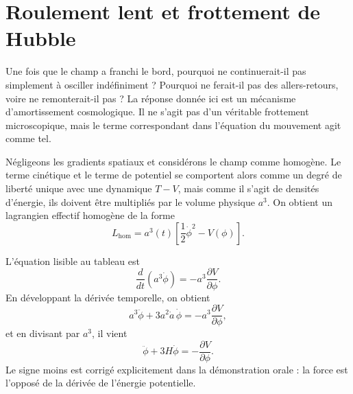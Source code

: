 \begin{classroomqa}
\end{classroomqa}

\section{Roulement lent et frottement de Hubble}

Une fois que le champ a franchi le bord, pourquoi ne continuerait-il pas simplement à osciller indéfiniment ? Pourquoi ne ferait-il pas des allers-retours, voire ne remonterait-il pas ? La réponse donnée ici est un mécanisme d’amortissement cosmologique. Il ne s’agit pas d’un véritable frottement microscopique, mais le terme correspondant dans l’équation du mouvement agit comme tel.

Négligeons les gradients spatiaux et considérons le champ comme homogène. Le terme cinétique et le terme de potentiel se comportent alors comme un degré de liberté unique avec une dynamique \(T-V\), mais comme il s’agit de densités d’énergie, ils doivent être multipliés par le volume physique \(a^3\). On obtient un lagrangien effectif homogène de la forme
\begin{equation}
L_{\mathrm{hom}}=a^3(t)\left[\frac12\dot\phi^2-V(\phi)\right].
\end{equation}

L’équation lisible au tableau est
\begin{equation}
\frac{d}{dt}\left(a^3\dot\phi\right)=-a^3\frac{\partial V}{\partial\phi}.
\end{equation}
En développant la dérivée temporelle, on obtient
\begin{equation}
a^3\ddot\phi+3a^2\dot a\,\dot\phi=-a^3\frac{\partial V}{\partial\phi},
\end{equation}
et en divisant par \(a^3\), il vient
\begin{equation}
\ddot\phi+3H\dot\phi=-\frac{\partial V}{\partial\phi}.
\end{equation}
Le signe moins est corrigé explicitement dans la démonstration orale : la force est l’opposé de la dérivée de l’énergie potentielle.

